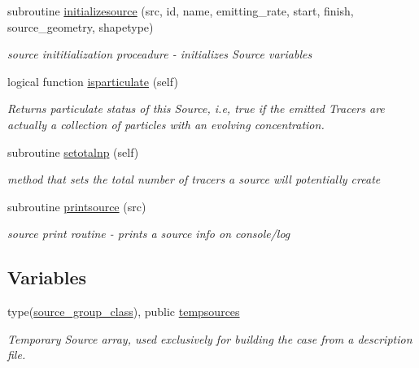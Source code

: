 \begin{DoxyCompactItemize}
subroutine \mbox{\hyperlink{namespacesources__mod_a6dcf7a3e3ccf75e01853df166231d484}{initializesource}} (src, id, name, emitting\+\_\+rate, start, finish, source\+\_\+geometry, shapetype)
\begin{DoxyCompactList}\small\item\em source inititialization proceadure -\/ initializes Source variables \end{DoxyCompactList}\item 
logical function \mbox{\hyperlink{namespacesources__mod_ac4e4f33da78d030e1b56a48789da6a05}{isparticulate}} (self)
\begin{DoxyCompactList}\small\item\em Returns particulate status of this Source, i.\+e, true if the emitted Tracers are actually a collection of particles with an evolving concentration. \end{DoxyCompactList}\item 
subroutine \mbox{\hyperlink{namespacesources__mod_a9a62c41b71d2d6ad85def74087542ef5}{setotalnp}} (self)
\begin{DoxyCompactList}\small\item\em method that sets the total number of tracers a source will potentially create \end{DoxyCompactList}\item 
subroutine \mbox{\hyperlink{namespacesources__mod_a641fe9ecc295e486a714c1aaa133d991}{printsource}} (src)
\begin{DoxyCompactList}\small\item\em source print routine -\/ prints a source info on console/log \end{DoxyCompactList}\end{DoxyCompactItemize}
\subsection*{Variables}
\begin{DoxyCompactItemize}
\item 
type(\mbox{\hyperlink{structsources__mod_1_1source__group__class}{source\+\_\+group\+\_\+class}}), public \mbox{\hyperlink{namespacesources__mod_ab04ea8c02cdf83a1a356c8710ae811d5}{tempsources}}
\begin{DoxyCompactList}\small\item\em Temporary Source array, used exclusively for building the case from a description file. \end{DoxyCompactList}\end{DoxyCompactItemize}


